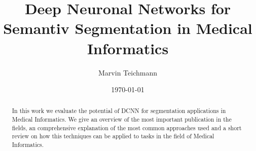 \documentclass[a4paper,leqno]{scrartcl}
\title{Deep Neuronal Networks for Semantiv Segmentation in Medical Informatics}
\author{Marvin Teichmann}
\date{\today}
\begin{document}
\maketitle

\begin{abstract}
In this work we evaluate the potential of \gls{DCNN} for segmentation applications in Medical Informatics. We give an overview of the most important publication in the fields, an comprehensive explanation of the most common approaches used  and a short review on how this techniques can be applied to tasks in the field of Medical Informatics.
\end{abstract}








%



\newpage



\printglossaries
\end{document}
